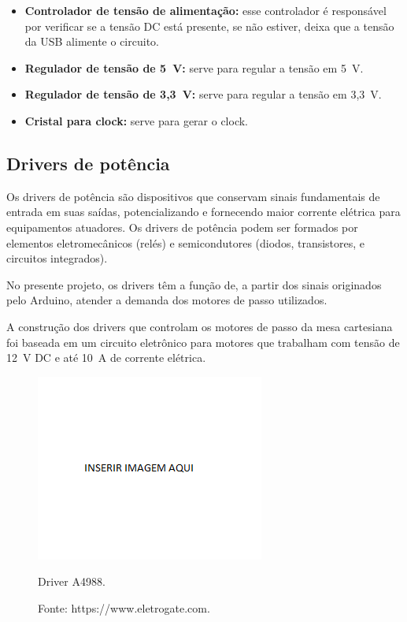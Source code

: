 \begin{itemize}
\item \textbf{Controlador de tensão de alimentação:} esse controlador é responsável por verificar se a tensão DC está presente, se não estiver, deixa que a tensão da \ac{USB} alimente o circuito. 
\item \textbf{Regulador de tensão de 5~V:} serve para regular a tensão em 5~V.
\item \textbf{Regulador de tensão de 3,3~V:} serve para regular a tensão em 3,3~V.
\item \textbf{Cristal para clock:} serve para gerar o clock.
\end{itemize}

\subsection{Drivers de potência}\label{subsec:metdriver}

Os drivers de potência são dispositivos que conservam sinais fundamentais de entrada em suas saídas, 
potencializando e fornecendo maior corrente elétrica para equipamentos atuadores. Os drivers de potência 
podem ser formados por elementos eletromecânicos (relés) e semicondutores (diodos, transistores, e 
circuitos integrados). 

No presente projeto, os drivers têm a função de, a partir dos sinais originados pelo Arduino, atender 
a demanda dos motores de passo utilizados.

A construção dos drivers que controlam os motores de passo da mesa cartesiana foi baseada em um 
circuito eletrônico para motores que trabalham com tensão de 12~V DC e até 10~A de corrente elétrica. 

\begin{figure}[H]
\centering
\includegraphics[scale = 0.4]{figuras/driver}
\caption{Driver A4988.}
\caption*{Fonte: https://www.eletrogate.com.}
\label{fig:driver}
\end{figure}

